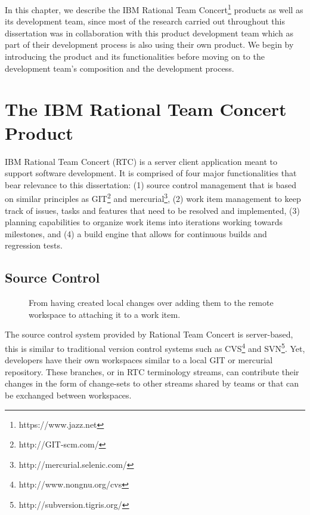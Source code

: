 \label{chap:rtc}
In this chapter, we describe the IBM Rational Team Concert\footnote{https://www.jazz.net} products as well as its development team,
since most of the research carried out throughout this dissertation was in collaboration with this product development team which as part of their development process is also using their own product.
We begin by introducing the product and its functionalities before moving on to the development team's composition and the development process.

\section{The IBM Rational Team Concert Product}
IBM Rational Team Concert (RTC) is a server client application meant to support software development.
It is comprised of four major functionalities that bear relevance to this dissertation:
(1) source control management that is based on similar principles as GIT\footnote{http://GIT-scm.com/} and mercurial\footnote{http://mercurial.selenic.com/}, (2) work item management to keep track of issues, tasks and features that need to be resolved and implemented, (3) planning capabilities to organize work items into iterations working towards milestones, and (4) a build engine that allows for continuous builds and regression tests.

\subsection{Source Control}
\begin{figure}
\centering
{}


\caption{From having created local changes over adding them to the remote workspace to attaching it to a work item.}
\label{fig:change-set}
\end{figure}

The source control system provided by Rational Team Concert is server-based, this is similar to traditional version control systems such as CVS\footnote{http://www.nongnu.org/cvs} and SVN\footnote{http://subversion.tigris.org/}.
Yet, developers have their own workspaces similar to a local GIT or mercurial repository.
These branches, or in RTC terminology streams, can contribute their changes in the form of change-sets to other streams shared by teams or that can be exchanged between workspaces.

